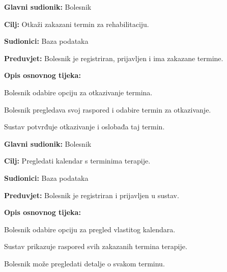 \documentclass{article}
\begin{document}
\vspace{1em} %
\begin{packed_item}
\item \textbf{Glavni sudionik:} Bolesnik
\item \textbf{Cilj:} Otkaži zakazani termin za rehabilitaciju.
\item \textbf{Sudionici:} Baza podataka
\item \textbf{Preduvjet:} Bolesnik je registriran, prijavljen i ima zakazane termine.
\item \textbf{Opis osnovnog tijeka:}
\begin{packed_enum}
\item Bolesnik odabire opciju za otkazivanje termina.
\item Bolesnik pregledava svoj raspored i odabire termin za otkazivanje.
\item Sustav potvrđuje otkazivanje i oslobađa taj termin.
\end{packed_enum}
\end{packed_item}

\vspace{1em} %
\begin{packed_item}
\item \textbf{Glavni sudionik:} Bolesnik
\item \textbf{Cilj:} Pregledati kalendar s terminima terapije.
\item \textbf{Sudionici:} Baza podataka
\item \textbf{Preduvjet:} Bolesnik je registriran i prijavljen u sustav.
\item \textbf{Opis osnovnog tijeka:}
\begin{packed_enum}
\item Bolesnik odabire opciju za pregled vlastitog kalendara.
\item Sustav prikazuje raspored svih zakazanih termina terapije.
\item Bolesnik može pregledati detalje o svakom terminu.
\end{packed_enum}
\end{packed_item}
\end{document}
